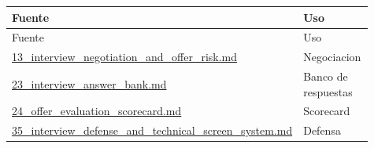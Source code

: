 \begin{center}
\scriptsize
\begin{longtable}{>{\raggedright\arraybackslash}p{0.455\linewidth} >{\raggedright\arraybackslash}p{0.455\linewidth}}
\toprule
Fuente & Uso \\
\midrule
\endfirsthead
\toprule
Fuente & Uso \\
\midrule
\endhead
\href{file:///E:/Laboral/13_interview_negotiation_and_offer_risk.md}{13\_interview\_negotiation\_and\_offer\_risk.md} & Negociacion \\
\href{file:///E:/Laboral/23_interview_answer_bank.md}{23\_interview\_answer\_bank.md} & Banco de respuestas \\
\href{file:///E:/Laboral/24_offer_evaluation_scorecard.md}{24\_offer\_evaluation\_scorecard.md} & Scorecard \\
\href{file:///E:/Laboral/35_interview_defense_and_technical_screen_system.md}{35\_interview\_defense\_and\_technical\_screen\_system.md} & Defensa \\
\bottomrule
\end{longtable}
\end{center}
